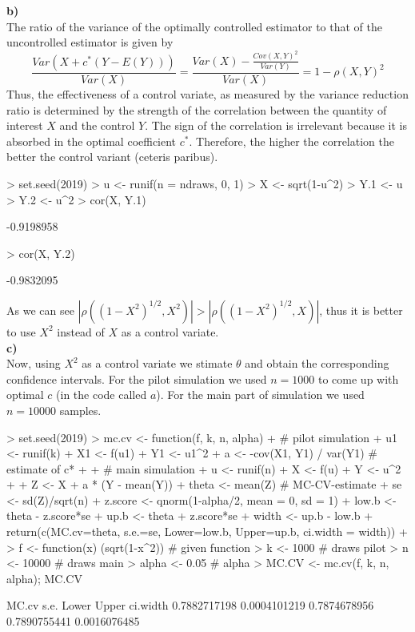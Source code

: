 \documentclass{article}
\begin{document}
\textbf{b)} \\
The ratio of the variance of the optimally controlled estimator to that of the uncontrolled estimator is given by
$$ \frac{Var(X+c^*(Y-E(Y)))}{Var(X)} = \frac{Var(X)-\frac{Cov(X,Y)^2}{Var(Y)}}{Var(X)} = 1 - \rho(X,Y)^2 $$
Thus, the effectiveness of a control variate, as measured by the variance reduction ratio is determined by the strength of the correlation between the quantity of interest $X$ and the control $Y$. The sign of the correlation is irrelevant because it is absorbed in the optimal coefficient $c^*$. Therefore, the higher the correlation the better the control variant (ceteris paribus).
\begin{Schunk}
\begin{Sinput}
> set.seed(2019)
> u <- runif(n = ndraws, 0, 1)
> X <- sqrt(1-u^2)
> Y.1 <- u
> Y.2 <- u^2
> cor(X, Y.1)
\end{Sinput}
\begin{Soutput}
[1] -0.9198958
\end{Soutput}
\begin{Sinput}
> cor(X, Y.2)
\end{Sinput}
\begin{Soutput}
[1] -0.9832095
\end{Soutput}
\end{Schunk}
As we can see $|\rho((1-X^2)^{1/2}, X^2)| > |\rho((1-X^2)^{1/2},X)|$, thus it is better to use $X^2$ instead of $X$ as a control variate. \\ 


\textbf{c)} \\
Now, using $X^2$ as a control variate we stimate $\theta$ and obtain the corresponding confidence intervals. For the pilot simulation we used $n = 1000$ to come up with optimal $c$ (in the code called $a$). For the main part of simulation we used $n = 10000$ samples. 
\begin{Schunk}
\begin{Sinput}
> set.seed(2019)
> mc.cv <- function(f, k, n, alpha) {
+   # pilot simulation
+   u1 <- runif(k)
+   X1 <- f(u1)
+   Y1 <- u1^2
+   a <- -cov(X1, Y1) / var(Y1) # estimate of c*
+ 
+   # main simulation
+   u <- runif(n)
+   X <- f(u)
+   Y <- u^2
+   
+   Z <- X + a * (Y - mean(Y))
+   theta <- mean(Z) # MC-CV-estimate
+   se <- sd(Z)/sqrt(n) 
+   z.score <- qnorm(1-alpha/2, mean = 0, sd = 1)
+   low.b <- theta - z.score*se
+   up.b <- theta + z.score*se
+   width <- up.b - low.b
+   return(c(MC.cv=theta, s.e.=se, Lower=low.b, Upper=up.b, ci.width = width))
+ }
> f <- function(x) (sqrt(1-x^2)) # given function
> k <- 1000 # draws pilot
> n <- 10000 # draws main
> alpha <- 0.05 # alpha 
> MC.CV <- mc.cv(f, k, n, alpha); MC.CV
\end{Sinput}
\begin{Soutput}
       MC.cv         s.e.        Lower        Upper     ci.width 
0.7882717198 0.0004101219 0.7874678956 0.7890755441 0.0016076485 
\end{Soutput}
\end{Schunk}
\end{document}
